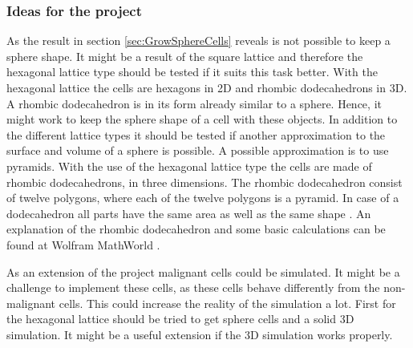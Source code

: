 \subsubsection{Ideas for the project}
As the result in section \ref{sec:GrowSphereCells} reveals is not possible to keep a sphere shape. It might be a result of the square lattice and therefore the hexagonal lattice type should be tested if it suits this task better. With the hexagonal lattice the cells are hexagons in 2D and rhombic dodecahedrons in 3D. A rhombic dodecahedron is in its form already similar to a sphere. Hence, it might work to keep the sphere shape of a cell with these objects. \newline
In addition to the different lattice types it should be tested if another approximation to the surface and volume of a sphere is possible. A possible approximation is to use pyramids. With the use of the hexagonal lattice type the cells are made of rhombic dodecahedrons, in three dimensions. The rhombic dodecahedron consist of twelve polygons, where each of the twelve polygons is a pyramid. In case of a dodecahedron all parts have the same area as well as the same shape \cite{Horn1984}. An explanation of the rhombic dodecahedron and some basic calculations can be found at Wolfram MathWorld \cite{RhombicDodecahedron.html}.


As an extension of the project malignant cells could be simulated. It might be a challenge to implement these cells, as these cells behave differently from the non-malignant cells. This could increase the reality of the simulation a lot. First for the hexagonal lattice should be tried to get sphere cells and a solid 3D simulation. It might be a useful extension if the 3D simulation works properly.


